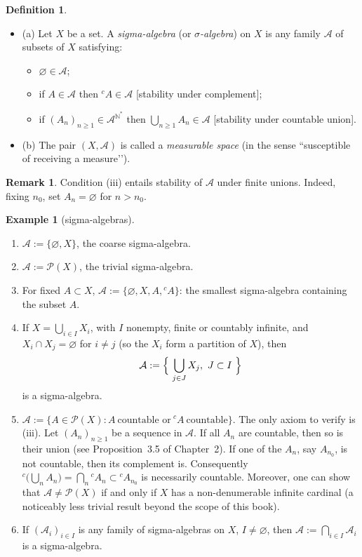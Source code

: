 \documentclass[12pt]{article}
\theoremstyle{definition}
\newtheorem{definition}{Definition}[section]
\newtheorem{example}{Example}[section]
\newtheorem{remark}{Remark}[section]
\begin{document}
\begin{definition}
\begin{itemize}
\item (a) Let $X$ be a set. A \emph{sigma-algebra} (or \emph{$\sigma$-algebra}) on $X$ is any family $\mathcal A$ of subsets of $X$ satisfying:
\begin{itemize}[leftmargin=1.5em]
\item[(i)] $\varnothing\in\mathcal A$;
\item[(ii)] if $A\in\mathcal A$ then ${}^{c}\!A\in\mathcal A$ \hfill[stability under complement];
\item[(iii)] if $(A_n)_{n\ge1}\in\mathcal A^{\mathbb N^{\!*}}$ then $\displaystyle \bigcup_{n\ge1} A_n\in\mathcal A$ \hfill[stability under countable union].
\end{itemize}
\item (b) The pair $(X,\mathcal A)$ is called a \emph{measurable space} (in the sense “susceptible of receiving a measure’’).
\end{itemize}
\end{definition}

\begin{remark} 
Condition (iii) entails stability of $\mathcal A$ under finite unions. Indeed, fixing $n_0$, set $A_n=\varnothing$ for $n>n_0$.
\end{remark}

\begin{example}[sigma-algebras]

\begin{enumerate}[leftmargin=1.5em,label=\arabic*.]
\item $\mathcal A:=\{\varnothing,X\}$, the coarse sigma-algebra.
\item $\mathcal A:=\mathcal P(X)$, the trivial sigma-algebra.
\item For fixed $A\subset X$, $\mathcal A:=\{\varnothing,X,A,{}^{c}\!A\}$: the smallest sigma-algebra containing the subset $A$.
\item If $X=\bigcup_{i\in I} X_i$, with $I$ nonempty, finite or countably infinite, and $X_i\cap X_j=\varnothing$ for $i\ne j$ (so the $X_i$ form a partition of $X$), then
\[
\mathcal A:=\Bigl\{\ \bigcup_{j\in J} X_j,\ J\subset I\ \Bigr\}
\]
is a sigma-algebra.
\item $\mathcal A:=\{A\in\mathcal P(X): A\ \text{countable or}\ {}^{c}\!A\ \text{countable}\}$.
The only axiom to verify is (iii). Let $(A_n)_{n\ge1}$ be a sequence in $\mathcal A$.
If all $A_n$ are countable, then so is their union (see Proposition~3.5 of Chapter~2).
If one of the $A_n$, say $A_{n_0}$, is not countable, then its complement is.
Consequently ${}^{c}\!\bigl(\bigcup_n A_n\bigr)=\bigcap_n {}^{c}\!A_n\subset {}^{c}\!A_{n_0}$ is necessarily countable.
Moreover, one can show that $\mathcal A\ne\mathcal P(X)$ if and only if $X$ has a non-denumerable infinite cardinal (a noticeably less trivial result beyond the scope of this book).
\item If $(\mathcal A_i)_{i\in I}$ is any family of sigma-algebras on $X$, $I\ne\varnothing$, then $\displaystyle \mathcal A:=\bigcap_{i\in I}\mathcal A_i$ is a sigma-algebra.
\end{enumerate}
\end{example}
\end{document}
